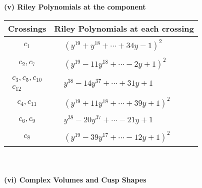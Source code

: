 \documentclass[1p]{elsarticle_modified}
\theoremstyle{definition}
\begin{document}
\newpage\renewcommand{\arraystretch}{1}
\flushleft \textbf{(v) Riley Polynomials at the component}\newline \\
\begin{tabular}{m{50pt}|m{274pt}}
Crossings & \hspace{64pt}Riley Polynomials at each crossing \\
\hline $$\begin{aligned}c_{1}\end{aligned}$$&$\begin{aligned}
&(y^{19}+y^{18}+\cdots+34 y-1)^{2}
\end{aligned}$\\
\hline $$\begin{aligned}c_{2},c_{7}\end{aligned}$$&$\begin{aligned}
&(y^{19}-11 y^{18}+\cdots-2 y+1)^{2}
\end{aligned}$\\
\hline $$\begin{aligned}c_{3},c_{5},c_{10}\\c_{12}\end{aligned}$$&$\begin{aligned}
&y^{38}-14 y^{37}+\cdots+31 y+1
\end{aligned}$\\
\hline $$\begin{aligned}c_{4},c_{11}\end{aligned}$$&$\begin{aligned}
&(y^{19}+11 y^{18}+\cdots+39 y+1)^{2}
\end{aligned}$\\
\hline $$\begin{aligned}c_{6},c_{9}\end{aligned}$$&$\begin{aligned}
&y^{38}-20 y^{37}+\cdots-21 y+1
\end{aligned}$\\
\hline $$\begin{aligned}c_{8}\end{aligned}$$&$\begin{aligned}
&(y^{19}-39 y^{17}+\cdots-12 y+1)^{2}
\end{aligned}$\\
\hline
\end{tabular}\\~\\
\newpage\flushleft \textbf{(vi) Complex Volumes and Cusp Shapes}
\end{document}
